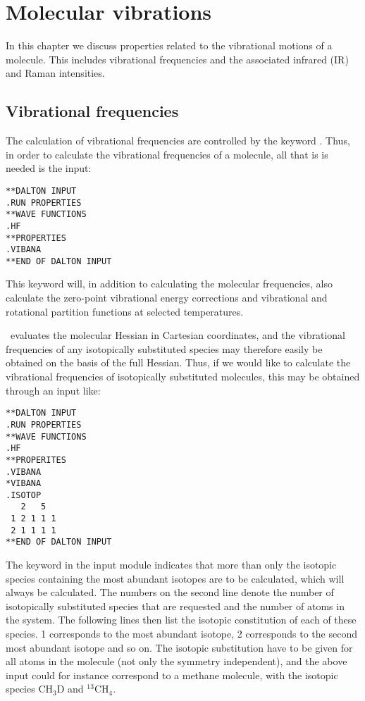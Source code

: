 \chapter{Molecular vibrations}\label{ch:vibrot}

In this chapter we discuss properties related  to the
vibrational motions of a molecule. This includes
vibrational frequencies and the associated infrared
(IR) and Raman intensities.

\section{Vibrational frequencies}\label{sec:vibfreq}

The calculation of vibrational frequencies are
controlled by the keyword . Thus, in order to
calculate the vibrational frequencies
of a molecule, all that is is needed is the input:

\begin{verbatim}
**DALTON INPUT
.RUN PROPERTIES
**WAVE FUNCTIONS
.HF
**PROPERTIES
.VIBANA
**END OF DALTON INPUT
\end{verbatim}

This keyword will, in addition to calculating the molecular
frequencies, also calculate the zero-point vibrational
energy corrections and vibrational
and rotational partition functions
at selected temperatures.

\dalton\ evaluates the molecular Hessian in Cartesian
coordinates, and
the vibrational frequencies of any isotopically substituted  species
may therefore easily be obtained on the basis of the full
Hessian. Thus, if we would like to calculate the vibrational
frequencies of isotopically substituted molecules, this may be obtained through an input like:

\begin{verbatim}
**DALTON INPUT
.RUN PROPERTIES
**WAVE FUNCTIONS
.HF
**PROPERITES
.VIBANA
*VIBANA
.ISOTOP
   2   5
 1 2 1 1 1
 2 1 1 1 1
**END OF DALTON INPUT
\end{verbatim}

The keyword  in the  input module
indicates that more than only the isotopic species containing the most
abundant isotopes are to be calculated, which will always be
calculated. The numbers on the second line denote the number of
isotopically substituted species that are requested and the number of
atoms in the system. The following lines then
list the isotopic constitution of each of these species. 1
corresponds to the most abundant isotope, 2 corresponds to the second
most abundant isotope and so on. The isotopic substitution have to be
given for all atoms in the molecule (not only the symmetry
independent), and the above input could for instance correspond to a
methane molecule, with the isotopic species CH$_3$D
and $^{13}$CH$_4$.

